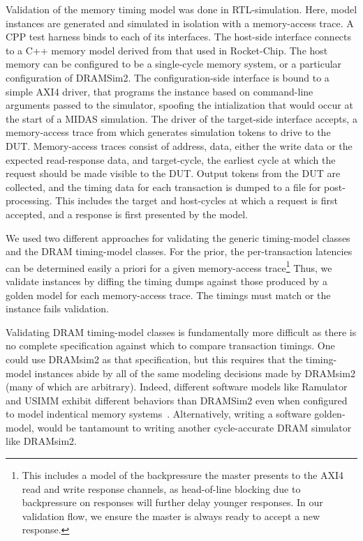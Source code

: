 Validation of the memory timing model was done in RTL-simulation. Here, model
instances are generated and simulated in isolation with a memory-access trace.
A CPP test harness binds to each of its interfaces.  The host-side interface
connects to a C++ memory model derived from that used in Rocket-Chip. The host
memory can be configured to be a single-cycle memory system, or a particular
configuration of DRAMSim2.  The configuration-side interface is bound to a
simple AXI4 driver, that programs the instance based on command-line arguments
passed to the simulator, spoofing the intialization that would occur at the
start of a MIDAS simulation. The driver of the target-side interface accepts, a
memory-access trace from which generates simulation tokens to drive to the DUT.
Memory-access traces consist of address, data, either the write data or the
expected read-response data, and target-cycle, the earliest cycle at which the
request should be made visible to the DUT. Output tokens from the DUT are
collected, and the timing data for each transaction is dumped to a file for
post-processing. This includes the target and host-cycles at which a request is
first accepted, and a response is first presented by the model.

We used two different approaches for validating the generic timing-model classes
and the DRAM timing-model classes. For the prior, the per-transaction latencies
can be determined easily a priori for a given memory-access trace\footnote{This
includes a model of the backpressure the master presents to the AXI4 read and
write response channels, as head-of-line blocking due to backpressure on
responses will further delay younger responses.  In our validation flow, we
ensure the master is always ready to accept a new response.} Thus, we validate
instances by diffing the timing dumps against those produced by a golden model
for each memory-access trace. The timings must match or the instance fails
validation.

Validating DRAM timing-model classes is fundamentally more difficult as there
is no complete specification against which to compare transaction timings.
One could use DRAMsim2 as that specification, but this requires that the
timing-model instances abide by all of the same modeling decisions made by
DRAMsim2 (many of which are arbitrary). Indeed, different software models like
Ramulator and USIMM exhibit different behaviors than DRAMSim2 even when
configured to model indentical memory systems~\cite{ramulator}. Alternatively,
writing a software golden-model, would be tantamount to writing another
cycle-accurate DRAM simulator like DRAMsim2.

